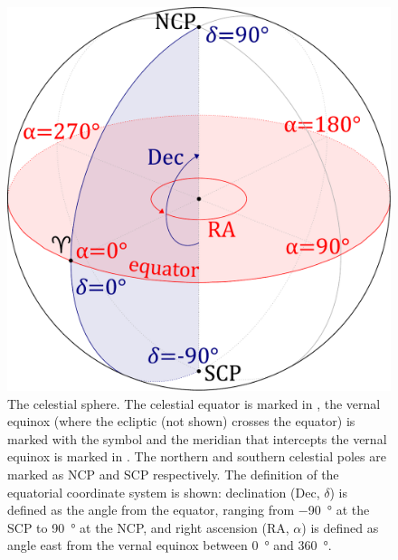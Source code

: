 \begin{colsection}
\begin{colsection}

\begin{figure}[p]
    \begin{center}
        \includegraphics[width=\linewidth]{images/globe1.pdf} %
    \end{center}
    \caption[The celestial sphere]{
        The celestial sphere. The celestial equator is marked in , the vernal equinox (where the ecliptic (not shown) crosses the equator) is marked with the symbol \Aries{} and the meridian that intercepts the vernal equinox is marked in . The northern and southern celestial poles are marked as NCP and SCP respectively. The definition of the equatorial coordinate system is shown: declination (Dec, $\delta$) is defined as the angle from the equator, ranging from \SI{-90}{\degree} at the SCP to \SI{90}{\degree} at the NCP, and right ascension (RA, $\alpha$) is defined as angle east from the vernal equinox between \SI{0}{\degree} and \SI{360}{\degree}.
    }\label{fig:sphere}
\end{figure}


\end{colsection}
\end{colsection}
